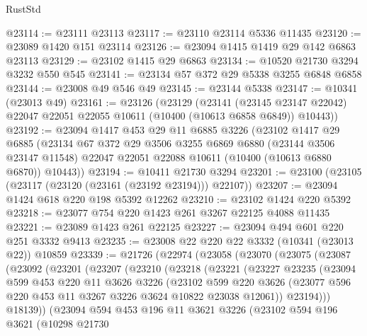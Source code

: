 \begin{lexlean}{RustStd}
\begin{coremodule}
@23114 := @23111 @23113
@23117 := @23110 @23114 @5336 @11435
@23120 := @23089 @1420 @151 @23114
@23126 := @23094 @1415 @1419 @29 @142 @6863 @23113
@23129 := @23102 @1415 @29 @6863
@23134 := @10520 @21730 @3294 @3232 @550 @545
@23141 := @23134 @57 @372 @29 @5338 @3255 @6848 @6858
@23144 := @23008 @49 @546 @49
@23145 := @23144 @5338
@23147 := @10341 (@23013 @49)
@23161 := @23126
    (@23129
      (@23141
        (@23145 @23147 @22042)
        @22047
        @22051
        @22055
        @10611
        (@10400 (@10613 @6858 @6849))
        @10443))
@23192 := @23094
    @1417
    @453
    @29
    @11
    @6885
    @3226
    (@23102
      @1417
      @29
      @6885
      (@23134
        @67
        @372
        @29
        @3506
        @3255
        @6869
        @6880
        (@23144 @3506 @23147 @11548)
        @22047
        @22051
        @22088
        @10611
        (@10400 (@10613 @6880 @6870))
        @10443))
@23194 := @10411 @21730 @3294
@23201 := @23100 (@23105 (@23117 (@23120 (@23161 (@23192 @23194))) @22107))
@23207 := @23094 @1424 @618 @220 @198 @5392 @12262
@23210 := @23102 @1424 @220 @5392
@23218 := @23077 @754 @220 @1423 @261 @3267 @22125 @4088 @11435
@23221 := @23089 @1423 @261 @22125
@23227 := @23094 @494 @601 @220 @251 @3332 @9413
@23235 := @23008 @22 @220 @22 @3332 (@10341 (@23013 @22)) @10859
@23339 := @21726
    (@22974
      (@23058
        (@23070
          (@23075
            (@23087
              (@23092
                (@23201
                  (@23207
                    (@23210
                      (@23218
                        (@23221
                          (@23227
                            @23235
                            (@23094
                              @599
                              @453
                              @220
                              @11
                              @3626
                              @3226
                              (@23102
                                @599
                                @220
                                @3626
                                (@23077 @596 @220 @453 @11 @3267 @3226 @3624 @10822 @23038 @12061))
                              @23194)))
                        @18139))
                    (@23094
                      @594
                      @453
                      @196
                      @11
                      @3621
                      @3226
                      (@23102
                        @594
                        @196
                        @3621
                        (@10298
                          @21730

\end{coremodule}
\end{lexlean}
